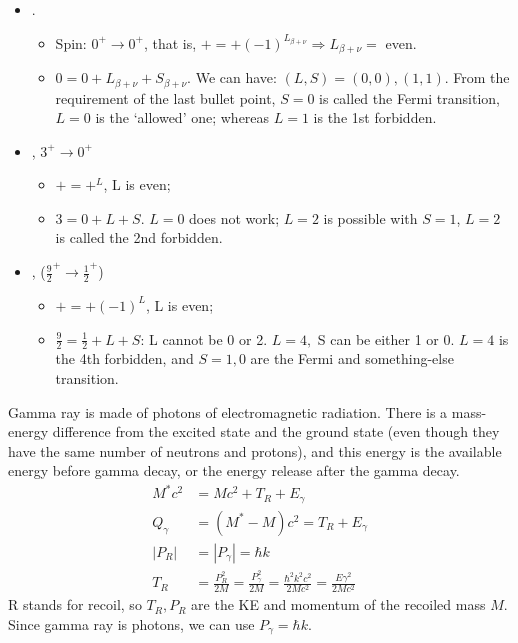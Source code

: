 \documentclass{school-22.101-notes}
\begin{document}
\begin{itemize} 
\item {}. 
    \begin{itemize} 
    \item Spin: $0^+ \to 0^+$, that is, $+ = + (-1)^{L_{\beta + \nu}} \Rightarrow L_{\beta + \nu} = $ even. 
    \item $ 0 = 0 + L_{\beta + \nu}+ S_{\beta + \nu}$. We can have: $(L, S) = (0,0), (1,1)$. From the requirement of the last bullet point, $S=0$ is called the Fermi transition, $L=0$ is the `allowed' one; whereas $L=1$ is the 1st forbidden.  
    \end{itemize}
\item {}, $3^+ \to 0^+$
    \begin{itemize}
    \item $+ = +^L$, L is even;
    \item $3 = 0 + L + S$. $L = 0$ does not work; $L = 2$ is possible with $S=1$, $L = 2$ is called the 2nd forbidden. 
    \end{itemize}
\item {}, ($\frac{9}{2}^+ \to \frac{1}{2}^+ $)
    \begin{itemize}
    \item $+ = + (-1)^L$, L is even;
    \item $\frac{9}{2} = \frac{1}{2} + L + S$: L cannot be 0 or 2. $L =4,$ S can be either 1 or 0. $L = 4$ is the 4th forbidden, and $S = 1, 0$ are the Fermi and something-else transition. 
    \end{itemize}    
\end{itemize}


Gamma ray is made of photons of electromagnetic radiation. There is a mass-energy difference from the excited state and the ground state (even though they have the same number of neutrons and protons), and this energy is the available energy before gamma decay, or the energy release after the gamma decay.
\begin{align}
M^* c^2 &= Mc^2 + T_R + E_{\gamma} \\
Q_{\gamma} &=  (M^* - M)c^2  = T_R + E_{\gamma} \\
|P_R| &= |P_{\gamma}| = \hbar k \\
T_R &= \frac{P_R^2}{2M} = \frac{P_{\gamma}^2}{2M} = \frac{\hbar^2 k^2 c^2}{2Mc^2} = \frac{E \gamma^2}{2Mc^2} 
\end{align}
 R stands for recoil, so $T_R, P_R$ are the KE and momentum of the recoiled mass $M$. Since gamma ray is photons, we can use $P_{\gamma} = \hbar k$. 
 
\end{document}
